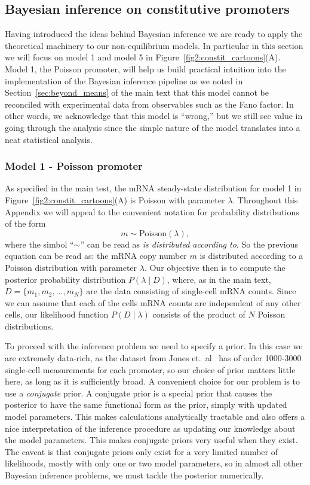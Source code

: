 \subsection{Bayesian inference on constitutive promoters}
\label{sec:si_bayes_unreg}

Having introduced the ideas behind Bayesian inference we are ready to apply the
theoretical machinery to our non-equilibrium models. In particular in this
section we will focus on model 1 and model 5 in
Figure~\ref{fig2:constit_cartoons}(A). Model 1, the Poisson promoter, will help
us build practical intuition into the implementation of the Bayesian inference
pipeline as we noted in Section~\ref{sec:beyond_means} of the main text that
this model cannot be reconciled with experimental data from observables such as
the Fano factor. In other words, we acknowledge that this model is ``wrong,''
but we still see value in going through the analysis since the simple nature of
the model translates into a neat statistical analysis.

\subsubsection{Model 1 - Poisson promoter}

As specified in the main test, the mRNA steady-state distribution for model 1 in
Figure~\ref{fig2:constit_cartoons}(A) is Poisson with parameter $\lambda$.
Throughout this Appendix we will appeal to the convenient notation for
probability distributions of the form
\begin{equation}
m \sim \text{Poisson}(\lambda),
\end{equation}
where the simbol ``$\sim$'' can be read as \textit{is distributed according to}.
So the previous equation can be read as: the mRNA copy number $m$ is distributed
according to a Poisson distribution with parameter $\lambda$. Our objective then
is to compute the posterior probability distribution $P(\lambda \mid D)$, where,
as in the main text, $D = \{ m_1, m_2, \ldots, m_N \}$ are the data consisting
of single-cell mRNA counts. Since we can assume that each of the cells mRNA
counts are independent of any other cells, our likelihood function $P(D \mid
\lambda)$ consists of the product of $N$ Poisson distributions.

To proceed with the inference problem we need to specify a prior. In this case
we are extremely data-rich, as the dataset from Jones et.\ al~\cite{Jones2014}
has of order 1000-3000 single-cell measurements for each promoter, so our choice
of prior matters little here, as long as it is sufficiently broad. A convenient
choice for our problem is to use a \textit{conjugate} prior. A conjugate prior
is a special prior that causes the posterior to have the same functional form as
the prior, simply with updated model parameters. This makes calculations
analytically tractable and also offers a nice interpretation of the inference
procedure as updating our knowledge about the model parameters. This makes
conjugate priors very useful when they exist. The caveat is that conjugate
priors only exist for a very limited number of likelihoods, mostly with only one
or two model parameters, so in almost all other Bayesian inference problems, we
must tackle the posterior numerically.

